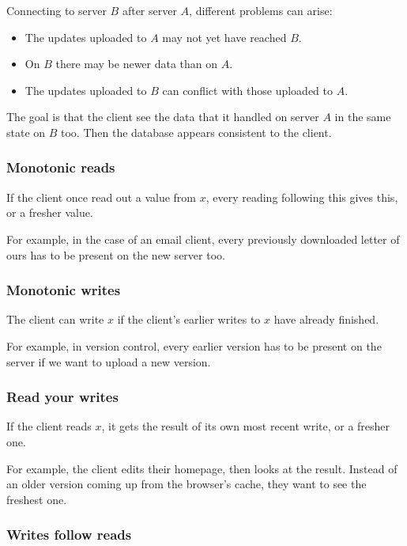 \documentclass[margin=0px]{article}
\begin{document}
Connecting to server $B$ after server $A$, different problems can arise:

\begin{itemize}
    \item	The updates uploaded to $A$ may not yet have reached $B$.
    \item	On $B$ there may be newer data than on $A$.
    \item	The updates uploaded to $B$ can conflict with those uploaded to $A$.
\end{itemize}

The goal is that the client see the data that it handled on server $A$ in the same state
on $B$ too. Then the database appears consistent to the client.\\

\subsubsection{Monotonic reads}
If the client once read out a value from $x$, every reading following this
gives this, or a fresher value.

For example, in the case of an email client, every previously downloaded letter of ours has to be present on the new server too.

\subsubsection{Monotonic writes}

The client can write $x$ if the client's earlier writes to $x$ have already finished.

For example, in version control, every earlier version has to be present on the server if we want to upload a new version.

\subsubsection{Read your writes}

If the client reads $x$, it gets the result of its own most recent write, or a fresher one.

For example, the client edits their homepage, then looks at the result. Instead of an older version coming up from the browser's cache,
they want to see the freshest one.

\subsubsection{Writes follow reads}
\end{document}
